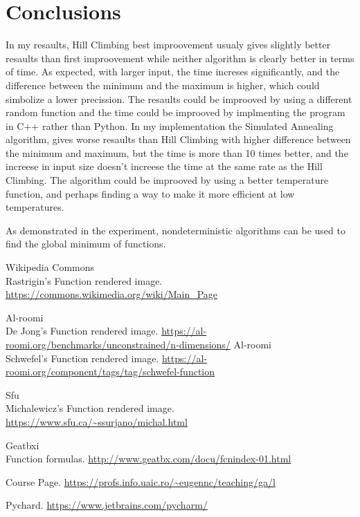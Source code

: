 \documentclass{report}
\begin{document}
\section{Conclusions}
In my resaults, Hill Climbing best improovement usualy gives slightly better resaults than first improovement while neither algorithm is clearly better in terms of time.
\newline
As expected, with larger input, the time increses significantly, and the difference between the minimum and the maximum is higher, which could simbolize a lower precission.
\newline
The resaults could be improoved by using a different random function and the time could be improoved by implmenting the program in C++ rather than Python.
\newline
In my implementation the Simulated Annealing algorithm, gives worse resaults than Hill Climbing with higher difference between the minimum and maximum, but the time is more than 10 times better, and the increese in input size doesn't increese the time at the same rate as the Hill Climbing. 
\newline
The algorithm could be improoved by using a better temperature function, and perhaps finding a way to make it more efficient at low temperatures.
\newline

As demonstrated in the experiment, nondeterministic algorithms can be used to find the global minimum of functions.


\begin{thebibliography}{9}

  Wikipedia Commons \\ Rastrigin's Function rendered image.
  \url{https://commons.wikimedia.org/wiki/Main_Page}

  Al-roomi  \\ De Jong's Function rendered image.
  \url{https://al-roomi.org/benchmarks/unconstrained/n-dimensions/}
  Al-roomi  \\ Schwefel's Function rendered image.
  \url{https://al-roomi.org/component/tags/tag/schwefel-function}

   Sfu \\ Michalewicz's Function rendered image.  
\url{https://www.sfu.ca/~ssurjano/michal.html}


  Geatbxi  \\ Function formulas.
  \url{http://www.geatbx.com/docu/fcnindex-01.html}

  Course Page.
  \url{https://profs.info.uaic.ro/~eugennc/teaching/ga/l}

  Pychard.
  \url{https://www.jetbrains.com/pycharm/}


\end{thebibliography}  
\end{document}

